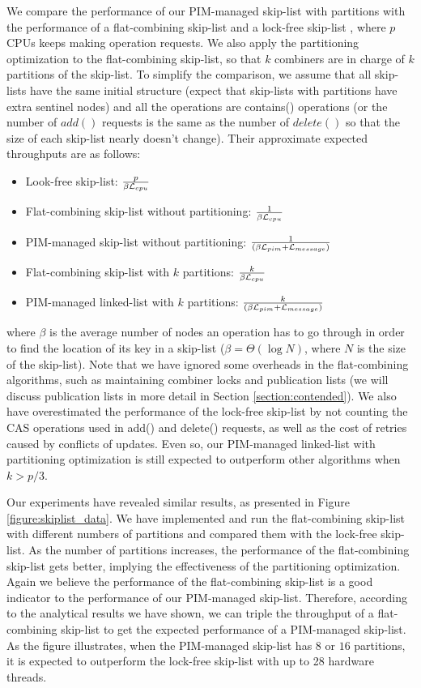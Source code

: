 We compare the performance of our PIM-managed skip-list with partitions 
with the performance of a flat-combining skip-list \cite{Hendler10}
and a lock-free skip-list \cite{Herlihy08}, 
where $p$ CPUs keeps making operation requests.
We also apply the partitioning optimization to the flat-combining skip-list, 
so that $k$ combiners are in charge of $k$ partitions of the skip-list. 
To simplify the comparison, we assume that all skip-lists have the same
initial structure (expect that skip-lists with partitions have extra sentinel nodes)
and all the operations are contains() operations
(or the number of $add()$ requests is the same as the number of $delete()$ 
so that the size of each skip-list nearly doesn't change).
Their approximate expected throughputs are as follows:
\begin{itemize}
\item Look-free skip-list:
	${p \over \beta\mathcal{L}_{cpu}}$

\item Flat-combining skip-list without partitioning:
	${1 \over \beta\mathcal{L}_{cpu}}$

\item PIM-managed skip-list without partitioning:
	${1 \over (\beta\mathcal{L}_{pim} + \mathcal{L}_{message})}$

\item Flat-combining skip-list with $k$ partitions:
    ${k \over \beta\mathcal{L}_{cpu}}$

\item PIM-managed linked-list with $k$ partitions:
    ${k \over (\beta\mathcal{L}_{pim} + \mathcal{L}_{message})}$
\end{itemize}
where $\beta$ is the average number of nodes an operation has to go through
in order to find the location of its key in a skip-list
($\beta = \Theta(\log N)$, where $N$ is the size of the skip-list).
Note that we have ignored some overheads in the flat-combining
algorithms, such as maintaining combiner locks and publication lists
(we will discuss publication lists in more detail in Section \ref{section:contended}).
We also have overestimated the performance of the lock-free skip-list by not counting the
CAS operations used in add() and delete() requests, as well as the cost of retries
caused by conflicts of updates.
Even so, our PIM-managed linked-list with partitioning optimization is
still expected to outperform other algorithms when $k > p/3$.

Our experiments have revealed similar results, 
as presented in Figure \ref{figure:skiplist_data}.
We have implemented and run the flat-combining skip-list with different numbers of
partitions and compared them with the lock-free skip-list.
As the number of partitions increases, the performance of the flat-combining skip-list
gets better, implying the effectiveness of the partitioning optimization.
Again we believe the performance of the flat-combining skip-list is a good indicator
to the performance of our PIM-managed skip-list.
Therefore, according to the analytical results we have shown, we can triple the throughput
of a flat-combining skip-list to get the expected performance of a PIM-managed skip-list.
As the figure illustrates, when the PIM-managed skip-list has $8$ or $16$ partitions,
it is expected to outperform the lock-free skip-list with up to 28 hardware threads.


